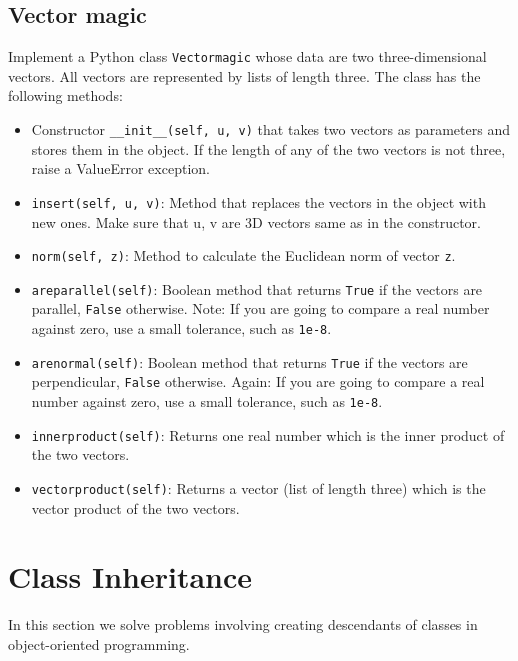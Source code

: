 
\subsection{Vector magic} \label{vectormagic}

Implement a Python class {\tt Vectormagic} whose data are two three-dimensional vectors.
All vectors are represented by lists of length three. The class has the following methods:
\begin{itemize}
\item Constructor {\tt \_\_init\_\_(self, u, v)} that takes two vectors as parameters and stores them in the object. 
      If the length of any of the two vectors is not three, raise a ValueError exception.
\item {\tt insert(self, u, v)}: Method that replaces the vectors in the object with new ones.
      Make sure that u, v are 3D vectors same as in the constructor.
\item {\tt norm(self, z)}: Method to calculate the Euclidean norm of vector {\tt z}.
\item {\tt areparallel(self)}: Boolean method that returns {\tt True} if the vectors are parallel,
      {\tt False} otherwise. Note: If you are going to compare a real number against zero,
      use a small tolerance, such as {\tt 1e-8}.
\item {\tt arenormal(self)}: Boolean method that returns {\tt True} if the vectors are perpendicular,
      {\tt False} otherwise. Again: If you are going to compare a real number against zero,
      use a small tolerance, such as {\tt 1e-8}.
\item {\tt innerproduct(self)}: Returns one real number which is the inner product of the two vectors.
\item {\tt vectorproduct(self)}: Returns a vector (list of length three) which is the vector product 
      of the two vectors.
\end{itemize}


\section{Class Inheritance}

In this section we solve problems involving creating descendants of classes 
in object-oriented programming. 


